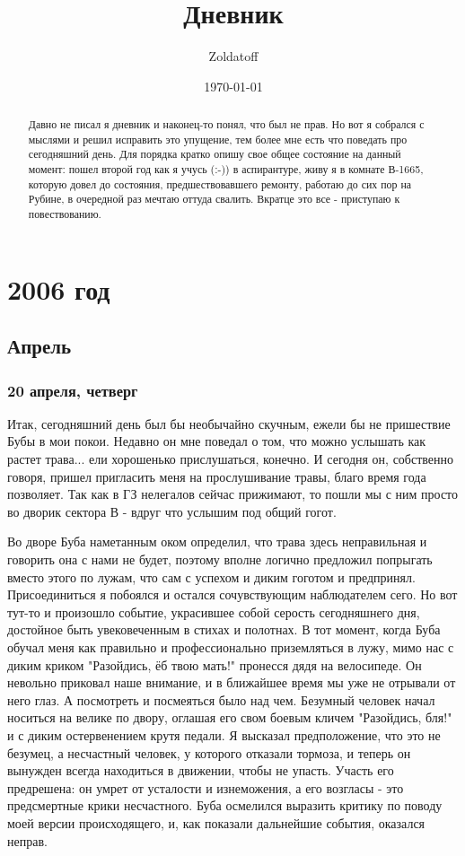 \documentclass[12pt,a4paper]{article}
\newcommand{\ssubsection}[1]{
	\subsubsection*{#1}
	\addcontentsline{toc}{subsubsection}{#1}
}
\begin{document}
\author{Zoldatoff}
\title{Дневник}
\date{\today}
\maketitle
\tableofcontents
\newpage

\begin{abstract}
Давно не писал я дневник и наконец-то понял, что был не прав. Но вот я собрался с мыслями и решил исправить это упущение, тем более мне есть что поведать про сегодняшний день. Для порядка кратко опишу свое общее состояние на данный момент: пошел второй год как я учусь (:-)) в аспирантуре, живу я в комнате В-1665, которую довел до состояния, предшествовавшего ремонту, работаю до сих пор на Рубине, в очередной раз мечтаю оттуда свалить. Вкратце это все - приступаю к повествованию.
\end{abstract}

\section*{2006 год}

\subsection*{Апрель}

\ssubsection{20 апреля, четверг}
Итак, сегодняшний день был бы необычайно скучным, ежели бы не пришествие Бубы в мои покои. Недавно он мне поведал о том, что можно услышать как растет трава... ели хорошенько прислушаться, конечно. И сегодня он, собственно говоря, пришел пригласить меня на прослушивание травы, благо время года позволяет. Так как в ГЗ нелегалов сейчас прижимают, то пошли мы с ним просто во дворик сектора В - вдруг что услышим под общий гогот.

Во дворе Буба наметанным оком определил, что трава здесь неправильная и говорить она с нами не будет, поэтому вполне логично предложил попрыгать вместо этого по лужам, что сам с успехом и диким гоготом и предпринял. Присоединиться я побоялся и остался сочувствующим наблюдателем сего. Но вот тут-то и произошло событие, украсившее собой серость сегодняшнего дня, достойное быть увековеченным в стихах и полотнах. В тот момент, когда Буба обучал меня как правильно и профессионально приземляться в лужу, мимо нас с диким криком "Разойдись, ёб твою мать!" пронесся дядя на велосипеде. Он невольно приковал наше внимание, и в ближайшее время мы уже не отрывали от него глаз. А посмотреть и посмеяться было над чем. Безумный человек начал носиться на велике по двору, оглашая его свом боевым кличем "Разойдись, бля!" и с диким остервенением крутя педали. Я высказал предположение, что это не безумец, а несчастный человек, у которого отказали тормоза, и теперь он вынужден всегда находиться в движении, чтобы не упасть. Участь его предрешена: он умрет от усталости и изнеможения, а его возгласы - это предсмертные крики несчастного. Буба осмелился выразить критику по поводу моей версии происходящего, и, как показали дальнейшие события, оказался неправ.
\end{document}

